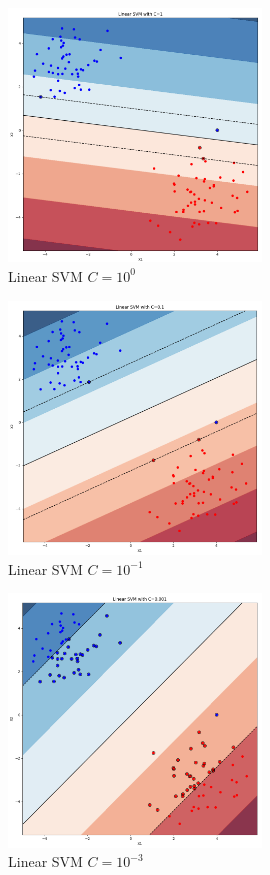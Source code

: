 \documentclass[12pt,a4paper]{article}
\begin{document}
\begin{enumerate}[a)]
\begin{figure}[H]
	\centering
  \includegraphics[width=0.6\textwidth]{figures/svm1_c_c1e0.png}
	\caption{Linear SVM $C=10^0$}
	\label{svm1_c_c1e0}
\end{figure}

\begin{figure}[H]
	\centering
  \includegraphics[width=0.6\textwidth]{figures/svm1_c_c1e-1.png}
	\caption{Linear SVM $C=10^{-1}$}
	\label{svm1_c_c1e-1}
\end{figure}

\begin{figure}[H]
	\centering
  \includegraphics[width=0.6\textwidth]{figures/svm1_c_c1e-3.png}
	\caption{Linear SVM $C=10^{-3}$}
	\label{svm1_c_c1e-3}
\end{figure}


\end{enumerate}
\end{document}
